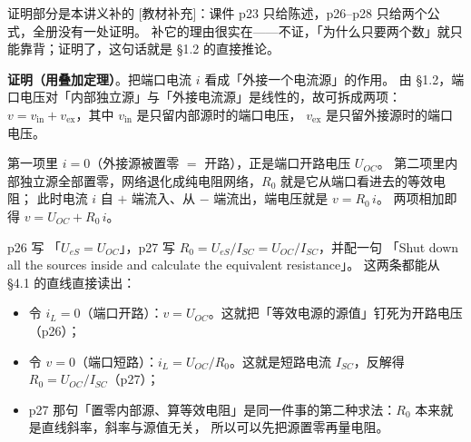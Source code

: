 \documentclass[11pt]{ctexart}
\begin{document}


证明部分是本讲义补的 [教材补充]：课件 p23 只给陈述，p26--p28 只给两个公式，全册没有一处证明。
补它的理由很实在——不证，「为什么只要两个数」就只能靠背；证明了，这句话就是 §1.2 的直接推论。

\textbf{证明（用叠加定理）}。把端口电流 $i$ 看成「外接一个电流源」的作用。
由 §1.2，端口电压对「内部独立源」与「外接电流源」是线性的，故可拆成两项：
$v=v_{\mathrm{in}}+v_{\mathrm{ex}}$，其中 $v_{\mathrm{in}}$ 是只留内部源时的端口电压，
$v_{\mathrm{ex}}$ 是只留外接源时的端口电压。

第一项里 $i=0$（外接源被置零 $=$ 开路），正是端口开路电压 $U_{OC}$。
第二项里内部独立源全部置零，网络退化成纯电阻网络，$R_0$ 就是它从端口看进去的等效电阻；
此时电流 $i$ 自 $+$ 端流入、从 $-$ 端流出，端电压就是 $v=R_0\,i$。
两项相加即得 $v=U_{OC}+R_0\,i$。



p26 写 「$U_{eS}=U_{OC}$」，p27 写 $R_0=U_{eS}/I_{SC}=U_{OC}/I_{SC}$，并配一句
「Shut down all the sources inside and calculate the equivalent resistance」。
这两条都能从 §4.1 的直线直接读出：

\begin{itemize}
\item 令 $i_L=0$（端口开路）：$v=U_{OC}$。这就把「等效电源的源值」钉死为开路电压（p26）；
\item 令 $v=0$（端口短路）：$i_L=U_{OC}/R_0$。这就是短路电流 $I_{SC}$，反解得 $R_0=U_{OC}/I_{SC}$（p27）；
\item p27 那句「置零内部源、算等效电阻」是同一件事的第二种求法：$R_0$ 本来就是直线斜率，斜率与源值无关，
      所以可以先把源置零再量电阻。
\end{itemize}
\end{document}
